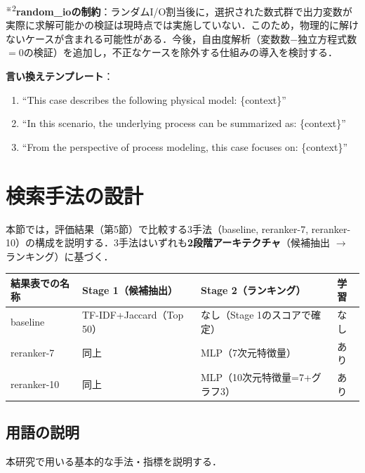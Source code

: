 \documentclass[11pt,a4paper]{ltjsarticle}
\begin{document}
\textsuperscript{※2}\textbf{random\_ioの制約}：ランダムI/O割当後に，選択された数式群で出力変数が実際に求解可能かの検証は現時点では実施していない．このため，物理的に解けないケースが含まれる可能性がある．今後，自由度解析（変数数$-$独立方程式数$=0$の検証）を追加し，不正なケースを除外する仕組みの導入を検討する．

\textbf{言い換えテンプレート}：
\begin{enumerate}[nosep]
  \item ``This case describes the following physical model: \{context\}''
  \item ``In this scenario, the underlying process can be summarized as: \{context\}''
  \item ``From the perspective of process modeling, this case focuses on: \{context\}''
\end{enumerate}

\section{検索手法の設計}

本節では，評価結果（第5節）で比較する3手法（baseline, reranker-7, reranker-10）の構成を説明する．3手法はいずれも\textbf{2段階アーキテクチャ}（候補抽出 $\to$ ランキング）に基づく．

\begin{table}[h]
\centering
\begin{tabular}{llll}
\toprule
結果表での名称 & Stage 1（候補抽出） & Stage 2（ランキング） & 学習 \\
\midrule
baseline & TF-IDF+Jaccard（Top 50） & なし（Stage 1のスコアで確定） & なし \\
reranker-7 & 同上 & MLP（7次元特徴量） & あり \\
reranker-10 & 同上 & MLP（10次元特徴量=7+グラフ3） & あり \\
\bottomrule
\end{tabular}
\end{table}

\subsection{用語の説明}

本研究で用いる基本的な手法・指標を説明する．
\end{document}
